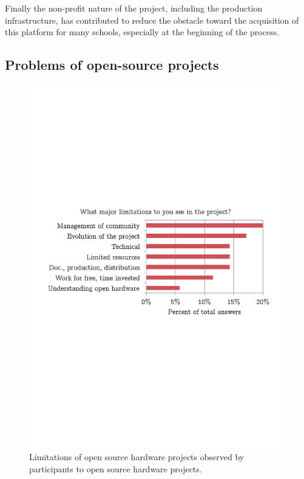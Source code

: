 \documentclass[letterpaper, 10 pt, conference]{ieeeconf}  %
\begin{document}
Finally the non-profit nature of the project, including the production infrastructure, has contributed to reduce the obstacle toward the acquisition of this platform for many schools, especially at the beginning of the process.

\subsection{Problems of open-source projects}

\begin{figure}
\centering
\includegraphics[width=\columnwidth]{figures/limitations}
\caption{Limitations of open source hardware projects observed by participants to open source hardware projects.}
\label{fig:problems}
\end{figure}
\end{document}

